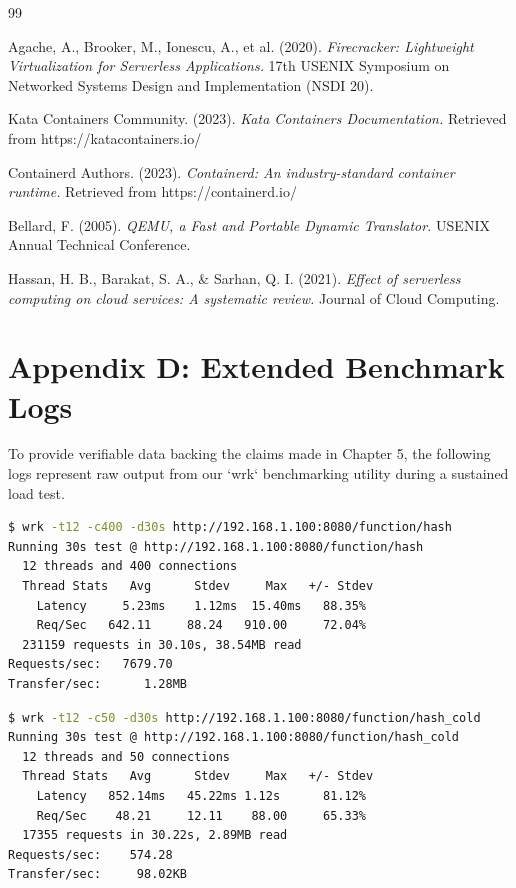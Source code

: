 \documentclass[12pt,a4paper]{report}
\begin{document}
\renewcommand{\bibname}{References}
\begin{thebibliography}{99}

Agache, A., Brooker, M., Ionescu, A., et al. (2020).
\textit{Firecracker: Lightweight Virtualization for Serverless Applications.}
17th USENIX Symposium on Networked Systems Design and Implementation (NSDI 20).

Kata Containers Community. (2023).
\textit{Kata Containers Documentation.}
Retrieved from https://katacontainers.io/

Containerd Authors. (2023).
\textit{Containerd: An industry-standard container runtime.}
Retrieved from https://containerd.io/

Bellard, F. (2005).
\textit{QEMU, a Fast and Portable Dynamic Translator.}
USENIX Annual Technical Conference.

Hassan, H. B., Barakat, S. A., \& Sarhan, Q. I. (2021).
\textit{Effect of serverless computing on cloud services: A systematic review.}
Journal of Cloud Computing.

\end{thebibliography}


\section{Appendix D: Extended Benchmark Logs}
To provide verifiable data backing the claims made in Chapter 5, the following logs represent raw output from our `wrk` benchmarking utility during a sustained load test.

\begin{lstlisting}[language=bash, caption={Raw wrk Benchmark Output - Paused Pool}]
$ wrk -t12 -c400 -d30s http://192.168.1.100:8080/function/hash
Running 30s test @ http://192.168.1.100:8080/function/hash
  12 threads and 400 connections
  Thread Stats   Avg      Stdev     Max   +/- Stdev
    Latency     5.23ms    1.12ms  15.40ms   88.35%
    Req/Sec   642.11     88.24   910.00     72.04%
  231159 requests in 30.10s, 38.54MB read
Requests/sec:   7679.70
Transfer/sec:      1.28MB
\end{lstlisting}

\begin{lstlisting}[language=bash, caption={Raw wrk Benchmark Output - Cold Starts}]
$ wrk -t12 -c50 -d30s http://192.168.1.100:8080/function/hash_cold
Running 30s test @ http://192.168.1.100:8080/function/hash_cold
  12 threads and 50 connections
  Thread Stats   Avg      Stdev     Max   +/- Stdev
    Latency   852.14ms   45.22ms 1.12s      81.12%
    Req/Sec    48.21     12.11    88.00     65.33%
  17355 requests in 30.22s, 2.89MB read
Requests/sec:    574.28
Transfer/sec:     98.02KB
\end{lstlisting}
\end{document}
